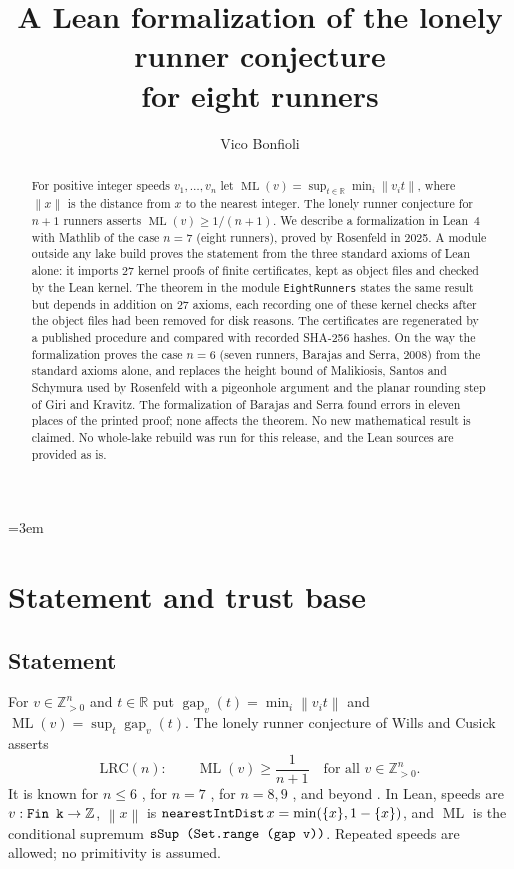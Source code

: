 \documentclass[11pt]{amsart}
\title[Lean formalization: eight lonely runners]{A Lean formalization of the lonely runner conjecture\\ for eight runners}
\author{Vico Bonfioli}
\date{}
\theoremstyle{plain}
\theoremstyle{definition}
\theoremstyle{remark}
\newcommand{\nrm}[1]{\left\lVert #1 \right\rVert}
\newcommand{\ML}{\operatorname{ML}}
\newcommand{\Z}{\mathbb{Z}}
\newcommand{\R}{\mathbb{R}}
\newcommand{\lean}[1]{{\def\_{\textunderscore\allowbreak}\def\.{.\allowbreak}\texttt{#1}}}
\newcommand{\LRC}{\mathrm{LRC}}
\begin{document}
\emergencystretch=3em

\begin{abstract}
For positive integer speeds $v_1,\dots,v_n$ let $\ML(v)=\sup_{t\in\R}\min_i\nrm{v_it}$, where
$\nrm{x}$ is the distance from $x$ to the nearest integer. The lonely runner conjecture for $n+1$
runners asserts $\ML(v)\ge 1/(n+1)$. We describe a formalization in Lean~4 with Mathlib of the case
$n=7$ (eight runners), proved by Rosenfeld in 2025. A module outside any lake build proves the
statement from the three standard axioms of Lean alone: it imports $27$ kernel proofs of finite
certificates, kept as object files and checked by the Lean kernel. The theorem in the module \lean{EightRunners}
states the same result but depends in addition on $27$ axioms, each recording one of these kernel
checks after the object files had been removed for disk reasons. The certificates are regenerated by
a published procedure and compared with recorded SHA-256 hashes. On the way the formalization proves the case
$n=6$ (seven runners, Barajas and Serra, 2008) from the standard axioms alone, and replaces the
height bound of Malikiosis, Santos and Schymura used by Rosenfeld with a pigeonhole argument and
the planar rounding step of Giri and Kravitz. The formalization of Barajas and Serra found errors in
eleven places of the printed proof; none affects the theorem. No new mathematical result is
claimed. No whole-lake rebuild was run for this release, and the Lean sources are provided as is.
\end{abstract}

\maketitle

\section{Statement and trust base}

\subsection{Statement}
For $v\in\Z_{>0}^n$ and $t\in\R$ put $\operatorname{gap}_v(t)=\min_i\nrm{v_it}$ and
$\ML(v)=\sup_t\operatorname{gap}_v(t)$. The lonely runner conjecture of Wills \cite{wills} and
Cusick \cite{cusick73} asserts
\[
\LRC(n):\qquad \ML(v)\ge \frac1{n+1}\quad\text{for all } v\in\Z_{>0}^n .
\]
It is known for $n\le 6$ \cite{bhk,bs}, for $n=7$ \cite{ros8}, for $n=8,9$ \cite{ros9,trak}, and
beyond \cite{st,allikvere}. In Lean, speeds are $v:\lean{Fin k}\to\Z$, $\nrm{x}$ is
$\lean{nearestIntDist}\,x=\min(\{x\},1-\{x\})$, and $\ML$ is the conditional supremum
$\lean{sSup (Set.range (gap v))}$. Repeated speeds are allowed; no primitivity is assumed.
\end{document}
